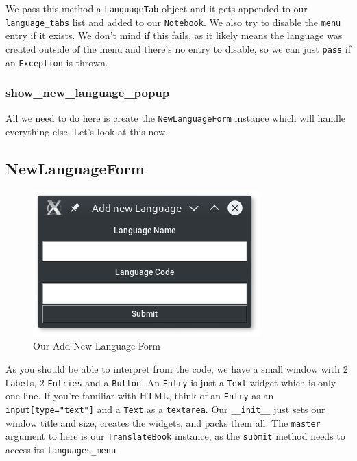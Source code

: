 \documentclass[a4paper,11pt,openany]{book}
\begin{document}
We pass this method a \lstinline[columns=fixed]{LanguageTab} object and it gets appended to our \lstinline[columns=fixed]{language_tabs} list and added to our \lstinline[columns=fixed]{Notebook}. We also try to disable the \lstinline[columns=fixed]{menu} entry if it exists. We don't mind if this fails, as it likely means the language was created outside of the menu and there's no entry to disable, so we can just \lstinline[columns=fixed]{pass} if an \lstinline[columns=fixed]{Exception} is thrown. 

\subsubsection{show\_new\_language\_popup}

All we need to do here is create the \lstinline[columns=fixed]{NewLanguageForm} instance which will handle everything else. Let's look at this now.

\newpage

\subsection{NewLanguageForm}

\begin{figure}[h]
\centering
\includegraphics{Ch3-3}
\caption{Our Add New Language Form}
\end{figure}


 
As you should be able to interpret from the code, we have a small window with 2 \lstinline[columns=fixed]{Label}s, 2 \lstinline[columns=fixed]{Entries} and a \lstinline[columns=fixed]{Button}. An \lstinline[columns=fixed]{Entry} is just a \lstinline[columns=fixed]{Text} widget which is only one line. If you're familiar with HTML, think of an \lstinline[columns=fixed]{Entry} as an \lstinline[columns=fixed]{input[type="text"]} and a \lstinline[columns=fixed]{Text} as a \lstinline[columns=fixed]{textarea}. Our \lstinline[columns=fixed]{__init__} just sets our window title and size, creates the widgets, and packs them all. The \lstinline[columns=fixed]{master} argument to here is our \lstinline[columns=fixed]{TranslateBook} instance, as the \lstinline[columns=fixed]{submit} method needs to access its \lstinline[columns=fixed]{languages_menu}
\end{document}
